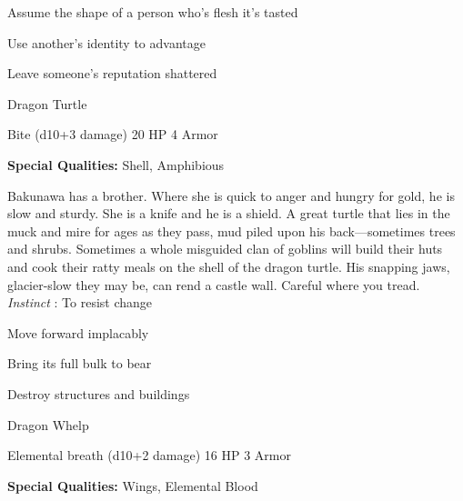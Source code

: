 \startitemize[1,packed]
         
\item Assume the shape of a person who's flesh it's tasted

         
\item Use another's identity to advantage

         
\item Leave someone's reputation shattered

       
\stopitemize
       
\startMonsterName
Dragon Turtle	 
\stopMonsterName
       

Bite (d10+3 damage)	20 HP	4 Armor

       


       
\startMonsterQualities
         {\bf Special Qualities:}  Shell, Amphibious
\stopMonsterQualities
       
\startMonsterDescription
Bakunawa has a brother. Where she is quick to anger and hungry for gold, he is slow and sturdy. She is a knife and he is a shield. A great turtle that lies in the muck and mire for ages as they pass, mud piled upon his back—sometimes trees and shrubs. Sometimes a whole misguided clan of goblins will build their huts and cook their ratty meals on the shell of the dragon turtle. His snapping jaws, glacier-slow they may be, can rend a castle wall. Careful where you tread. {\em Instinct} : To resist change
\stopMonsterDescription
       
\startitemize[1,packed]
         
\item Move forward implacably

         
\item Bring its full bulk to bear

         
\item Destroy structures and buildings

       
\stopitemize
       
\startMonsterName
Dragon Whelp	 
\stopMonsterName
       

Elemental breath (d10+2 damage)	16 HP	3 Armor

       


       
\startMonsterQualities
         {\bf Special Qualities:}  Wings, Elemental Blood
\stopMonsterQualities
       
